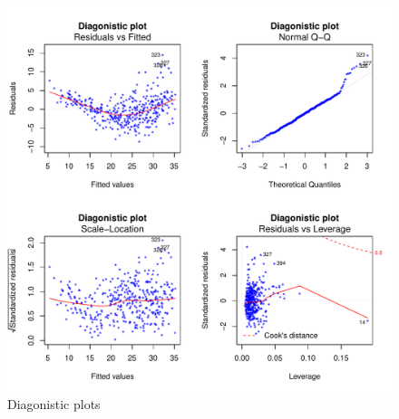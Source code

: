 \documentclass{article}[a4paper]
\begin{document}
\begin{figure}[H]
    \centering
    \includegraphics[width=6in]{HW1/diagplot.pdf}
    \caption{Diagonistic plots}
\end{figure}



\end{document}
